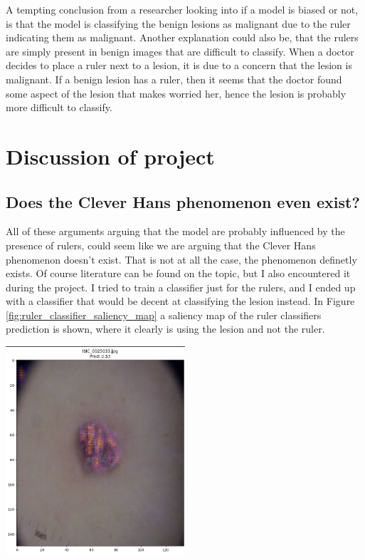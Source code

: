 A tempting conclusion from a researcher looking into if a model is biased or not,
is that the model is classifying the benign lesions as malignant due to the ruler indicating them 
as malignant.
Another explanation could also be, that the rulers are simply present in benign images that are 
difficult to classify.
When a doctor decides to place a ruler next to a lesion,
it is due to a concern that the lesion is malignant.
If a benign lesion has a ruler, then it seems that the doctor found 
some aspect of the lesion that makes worried her, 
hence the lesion is probably more difficult to classify.

\section{Discussion of project}
\subsection{Does the Clever Hans phenomenon even exist?}
All of these arguments arguing that the model are probably influenced by the presence of rulers,
could seem like we are arguing that the Clever Hans phenomenon doesn't exist.
That is not at all the case, the phenomenon definetly exists.
Of course literature can be found on the topic, but I also encountered it during the project.
I tried to train a classifier just for the rulers, and I ended up with a classifier that would
be decent at classifying the lesion instead. 
In Figure \ref{fig:ruler_classifier_saliency_map} a saliency map of the ruler classifiers prediction is shown,
where it clearly is using the lesion and not the ruler.

\begin{center}
    \includegraphics[width=0.5\textwidth]{images/ruler_classifier_saliency.png}
    \label{fig:ruler_classifier_saliency_map}
\end{center}

